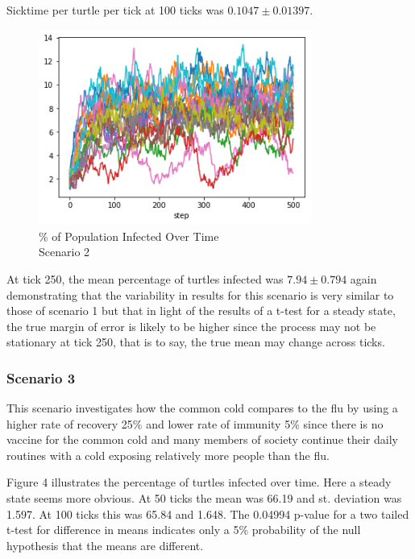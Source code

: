 \documentclass[11pt]{article} %
\begin{document}
Sicktime per turtle per tick at 100 ticks was $ 0.1047 \pm 0.01397$.

\begin{figure}
\centering
\includegraphics[width=0.8\textwidth]{20-runs-scenario-2-steady-state}
\caption{\% of Population Infected Over Time \\ Scenario 2}
\end{figure}



At tick 250, the mean percentage of turtles infected was $7.94 \pm 0.794$ again demonstrating that the variability in results for this scenario is very similar to those of scenario 1 but that in light of the results of a t-test for a steady state, the true margin of error is likely to be higher since the process may not be stationary at tick 250, that is to say, the true mean may change across ticks.  

\subsubsection{Scenario 3}


This scenario investigates how the common cold compares to the flu by using a higher rate of recovery 25\% and lower rate of immunity 5\% since there is no vaccine for the common cold and many members of society continue their daily routines with a cold exposing relatively more people than the flu. 


Figure 4 illustrates the percentage of turtles infected over time. Here a steady state seems more obvious. At 50 ticks the mean was 66.19 and st. deviation was 1.597. At 100 ticks this was 65.84 and 1.648. The 0.04994 p-value for a two tailed t-test for difference in means indicates only a 5\% probability of the null hypothesis that the means are different.
\end{document}
